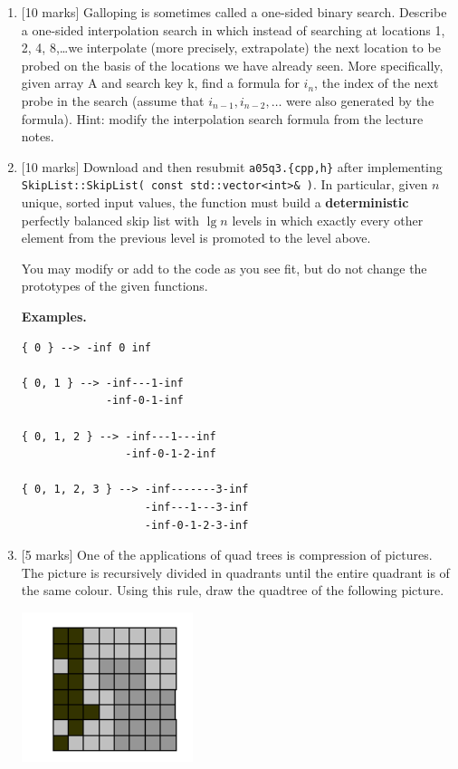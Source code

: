 \documentclass[11pt]{article}
\begin{document}
\begin{enumerate}
\item {[10 marks]}  
Galloping is sometimes called a one-sided binary search.
Describe a one-sided interpolation search in which instead of searching at locations 1, 2, 4, 8,\ldots we interpolate (more precisely, extrapolate) the next location to be probed on the basis of the locations we have already seen.
More specifically, given array A and search key k, find a formula for $i_n$, the index of the next probe in the search (assume that $i_{n-1}, i_{n-2}, \ldots$ were also generated by the formula).
Hint: modify the interpolation search formula from the lecture notes.

\item {[10 marks]}  
Download and then resubmit {\tt a05q3.\{cpp,h\}} after implementing {\tt SkipList::SkipList( const std::vector<int>\& )}. 
In particular, given $n$ unique, sorted input values, the function must build a {\bf deterministic} perfectly balanced skip list with $\lg n$ levels in which exactly every other element from the previous level is promoted to the level above.

You may modify or add to the code as you see fit, but do not change the prototypes of the given functions.

{\bf Examples.}
\begin{verbatim}
{ 0 } --> -inf 0 inf

{ 0, 1 } --> -inf---1-inf
             -inf-0-1-inf

{ 0, 1, 2 } --> -inf---1---inf
                -inf-0-1-2-inf

{ 0, 1, 2, 3 } --> -inf-------3-inf
                   -inf---1---3-inf
                   -inf-0-1-2-3-inf
\end{verbatim}

\item 	{[5 marks]}
One of the applications of quad trees is compression of pictures. The picture is recursively divided in quadrants until the entire quadrant is of the same colour. Using this rule, draw the quadtree of the following picture.

\includegraphics[width=50mm]{image.png} 


\end{enumerate}
\end{document}
